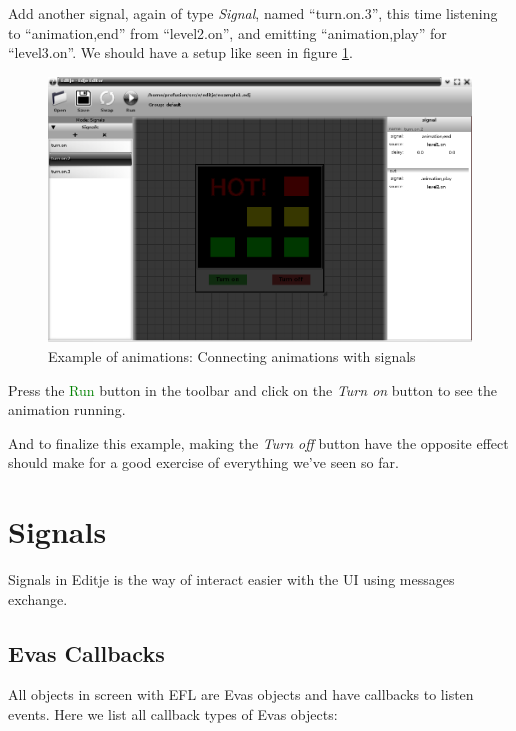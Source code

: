 \documentclass[a4paper]{profusion}
\newcommand{\GUIButton}[1]{\textcolor{green}{#1}} %
\begin{document}
Add another signal, again of type \emph{Signal}, named ``turn.on.3'',
this time listening to ``animation,end'' from ``level2.on'', and
emitting ``animation,play'' for ``level3.on''. We should have a setup
like seen in figure \ref{fig:anim1_signal_level2}.

\begin{figure}[h!]
  \centering
  \includegraphics[width=1.0\textwidth]{examples/anim1_signal_level2.png}
  \caption{Example of animations: Connecting animations with signals}
  \label{fig:anim1_signal_level2}
\end{figure}

Press the \GUIButton {Run} button in the toolbar and click on the
\emph{Turn on} button to see the animation running.

And to finalize this example, making the \emph{Turn off} button have
the opposite effect should make for a good exercise of everything
we've seen so far.

\section{Signals}
\label{sec:signal_editing}

Signals in Editje is the way of interact easier with the UI using
messages exchange.

\subsection{Evas Callbacks}
All objects in screen with EFL are Evas objects and have callbacks to
listen events. Here we list all callback types of Evas objects:
\end{document}
